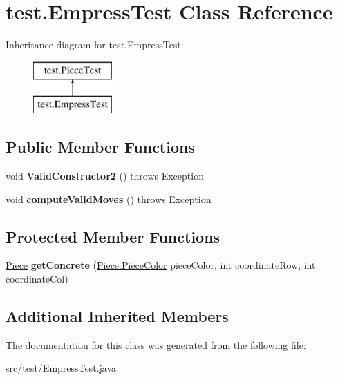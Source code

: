 \hypertarget{classtest_1_1_empress_test}{}\section{test.\+Empress\+Test Class Reference}
\label{classtest_1_1_empress_test}
Inheritance diagram for test.\+Empress\+Test\+:\begin{figure}[H]
\begin{center}
\leavevmode
\includegraphics[height=2.000000cm]{classtest_1_1_empress_test}
\end{center}
\end{figure}
\subsection*{Public Member Functions}
\begin{DoxyCompactItemize}
\item 
\mbox{\label{classtest_1_1_empress_test_aab262604daa5aab45f3134cc4e4319c4}} 
void {\bfseries Valid\+Constructor2} ()  throws Exception 
\item 
\mbox{\label{classtest_1_1_empress_test_ad942fad7fec2c8b1911835e92f10cf4e}} 
void {\bfseries compute\+Valid\+Moves} ()  throws Exception 
\end{DoxyCompactItemize}
\subsection*{Protected Member Functions}
\begin{DoxyCompactItemize}
\item 
\mbox{\label{classtest_1_1_empress_test_a5ad45102deaff8cfcbf90127ad8fb5ab}} 
\mbox{\hyperlink{classpieces_1_1_piece}{Piece}} {\bfseries get\+Concrete} (\mbox{\hyperlink{enumpieces_1_1_piece_1_1_piece_color}{Piece.\+Piece\+Color}} piece\+Color, int coordinate\+Row, int coordinate\+Col)
\end{DoxyCompactItemize}
\subsection*{Additional Inherited Members}


The documentation for this class was generated from the following file\+:\begin{DoxyCompactItemize}
\item 
src/test/Empress\+Test.\+java\end{DoxyCompactItemize}
